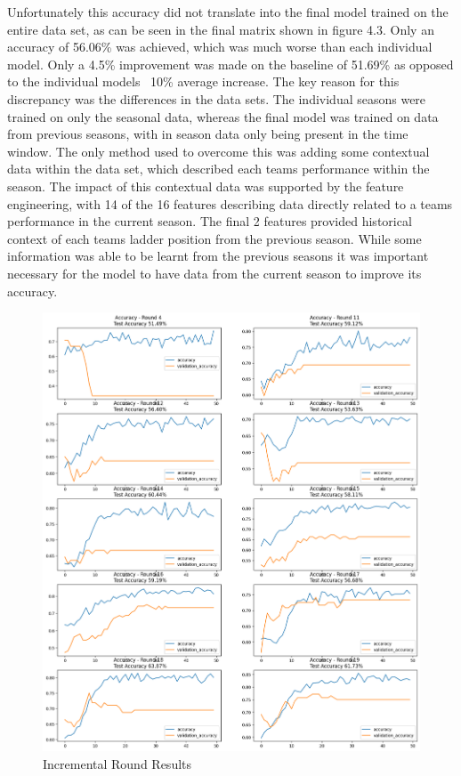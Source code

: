 \documentclass{imc-inf}
\begin{document}
	Unfortunately this accuracy did not translate into the final model trained on the entire data set, as can be seen in the final matrix shown in figure 4.3. Only an accuracy of 56.06\% was achieved, which was much worse than each individual model. Only a 4.5\% improvement was made on the baseline of 51.69\% as opposed to the individual models ~10\% average increase. The key reason for this discrepancy was the differences in the data sets. The individual seasons were trained on only the seasonal data, whereas the final model was trained on data from previous seasons, with in season data only being present in the time window. The only method used to overcome this was adding some contextual data within the data set, which described each teams performance within the season. The impact of this contextual data was supported by the feature engineering, with 14 of the 16 features describing data directly related to a teams performance in the current season. The final 2 features provided historical context of each teams ladder position from the previous season. While some information was able to be learnt from the previous seasons it was important necessary for the model to have data from the current season to improve its accuracy.
	
	\begin{figure}
		\caption{Incremental Round Results}
		\includegraphics[width=15cm]{media/r4-11-19-acc.png}
	\end{figure}
\end{document}
